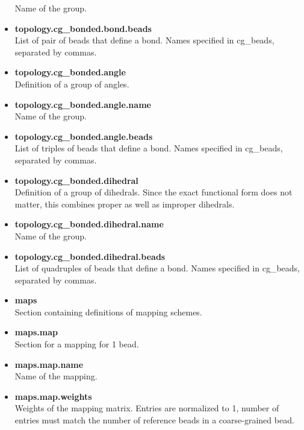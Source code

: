 \begin{itemize}
      Name of the group.
\item \textbf{topology.cg\_bonded.bond.beads} \\
      List of pair of beads that define a bond. Names specified in cg\_beads, separated by commas.
\item \textbf{topology.cg\_bonded.angle} \\
      Definition of a group of angles.
\item \textbf{topology.cg\_bonded.angle.name} \\
      Name of the group.
\item \textbf{topology.cg\_bonded.angle.beads} \\
      List of triples of beads that define a bond. Names specified in cg\_beads, separated by commas.
\item \textbf{topology.cg\_bonded.dihedral} \\
      Definition of a group of dihedrals. Since the exact functional form does not matter, this combines proper as well as improper dihedrals.
\item \textbf{topology.cg\_bonded.dihedral.name} \\
      Name of the group.
\item \textbf{topology.cg\_bonded.dihedral.beads} \\
      List of quadruples of beads that define a bond. Names specified in cg\_beads, separated by commas.
\item \textbf{maps} \\
      Section containing definitions of mapping schemes.
\item \textbf{maps.map} \\
      Section for a mapping for 1 bead.
\item \textbf{maps.map.name} \\
      Name of the mapping.
\item \textbf{maps.map.weights} \\
      Weights of the mapping matrix. Entries are normalized to 1, number of entries must match the number of reference beads in a coarse-grained bead.
\end{itemize}
